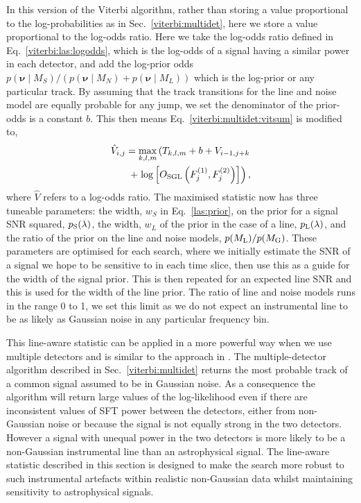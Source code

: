 In this version of the Viterbi algorithm, rather than storing a value proportional to the log-probabilities as in Sec.~\ref{viterbi:multidet}, here we store a value proportional to the log-odds ratio.
Here we take the log-odds ratio defined in Eq.~\ref{viterbi:las:logodds}, which is the log-odds of a signal having a similar power in each detector, and add the log-prior odds $p(\bm{\nu} \mid M_S)/(p(\bm{\nu} \mid M_N) + p(\bm{\nu} \mid M_L))$ which is the log-prior or any particular track. By assuming that the track transitions for the line and noise model are equally probable for any jump, we set the denominator of the prior-odds is a constant $b$.
This then means Eq.~\ref{viterbi:multidet:vitsum} is modified to,
\begin{equation}
\begin{split}
\label{lineaware:stat}
\hat{V}_{i,j} = \max_{k,l,m}\left(T_{k,l,m} + b + V_{i-1,j+k}   \right. \\
 + \left.  \log\left[O_{\rm{SGL}}\left(F^{(1)}_{j},F^{(2)}_{j}\right)\right]\right),
\end{split}
\end{equation}
%
where $\hat{V}$ refers to a log-odds ratio.
The maximised statistic now has three tuneable parameters: the width, $w_S$ in Eq.~\ref{las:prior}, on the prior for a signal \ac{SNR} squared, $p_{\rm S}(\lambda)$, the width, $w_L$ of the prior in the case of a line, $p_{\rm L}(\lambda)$, and the ratio of the prior on the line and noise models, $p({M_{\rm L}})/p({M_{\rm G}})$.  These parameters are optimised for each search, where we initially estimate the \ac{SNR} of a signal we hope to be sensitive to in each time slice, then use this as a guide for the width of the signal prior. This is then repeated for an expected line \ac{SNR} and this is used for the width of the line prior. The ratio of line and noise models runs in the range 0 to 1, we set this limit as we do not expect an instrumental line to be as likely as Gaussian noise in any particular frequency bin.

%
%
This line-aware statistic can be applied in a more powerful way when we use multiple detectors and is similar to the approach in \citep{keitel2014SearchContinuousa}. The multiple-detector algorithm described in Sec.~\ref{viterbi:multidet} returns the most probable track of a common signal assumed to be in Gaussian noise. As a consequence the algorithm will return large values of the log-likelihood even if there are inconsistent values of \ac{SFT} power between the detectors, either from non-Gaussian noise or because the signal is not equally strong in the two detectors. However a signal with unequal power in the two detectors is more likely to be a non-Gaussian instrumental line than an astrophysical signal. The line-aware statistic described in this section is designed to make the search more robust to such instrumental artefacts within realistic non-Gaussian data whilst maintaining sensitivity to astrophysical signals.

